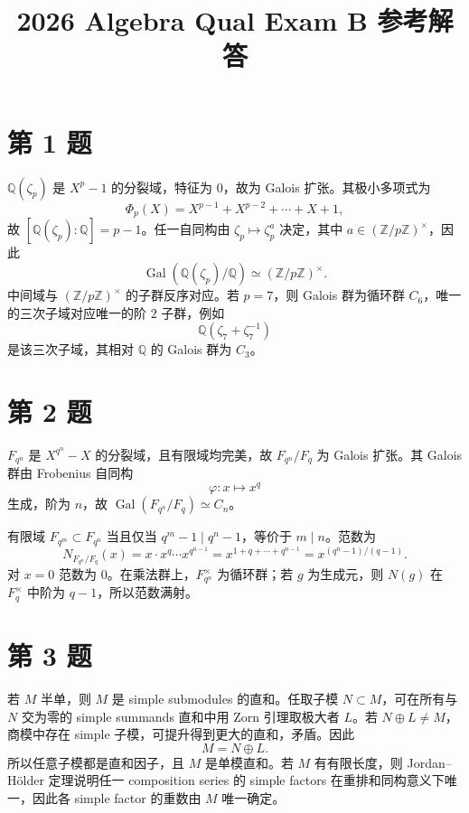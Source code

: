 \documentclass[11pt]{article}
\title{\textbf{2026 Algebra Qual Exam B 参考解答}}
\author{}
\date{}
\begin{document}
\maketitle

\section*{第 1 题}

\(\mathbb Q(\zeta_p)\) 是 \(X^p-1\) 的分裂域，特征为 \(0\)，故为 Galois 扩张。其极小多项式为
\[
  \Phi_p(X)=X^{p-1}+X^{p-2}+\cdots+X+1,
\]
故 \([\mathbb Q(\zeta_p):\mathbb Q]=p-1\)。任一自同构由 \(\zeta_p\mapsto \zeta_p^a\) 决定，其中 \(a\in(\mathbb Z/p\mathbb Z)^\times\)，因此
\[
  \operatorname{Gal}(\mathbb Q(\zeta_p)/\mathbb Q)\simeq(\mathbb Z/p\mathbb Z)^\times.
\]
中间域与 \((\mathbb Z/p\mathbb Z)^\times\) 的子群反序对应。若 \(p=7\)，则 Galois 群为循环群 \(C_6\)，唯一的三次子域对应唯一的阶 \(2\) 子群，例如
\[
  \mathbb Q(\zeta_7+\zeta_7^{-1})
\]
是该三次子域，其相对 \(\mathbb Q\) 的 Galois 群为 \(C_3\)。

\section*{第 2 题}

\(F_{q^n}\) 是 \(X^{q^n}-X\) 的分裂域，且有限域均完美，故 \(F_{q^n}/F_q\) 为 Galois 扩张。其 Galois 群由 Frobenius 自同构
\[
  \varphi:x\mapsto x^q
\]
生成，阶为 \(n\)，故 \(\operatorname{Gal}(F_{q^n}/F_q)\simeq C_n\)。

有限域 \(F_{q^m}\subset F_{q^n}\) 当且仅当 \(q^m-1\mid q^n-1\)，等价于 \(m\mid n\)。范数为
\[
  N_{F_{q^n}/F_q}(x)=x\cdot x^q\cdots x^{q^{n-1}}
  =x^{1+q+\cdots+q^{n-1}}
  =x^{(q^n-1)/(q-1)}.
\]
对 \(x=0\) 范数为 \(0\)。在乘法群上，\(F_{q^n}^\times\) 为循环群；若 \(g\) 为生成元，则 \(N(g)\) 在 \(F_q^\times\) 中阶为 \(q-1\)，所以范数满射。

\section*{第 3 题}

若 \(M\) 半单，则 \(M\) 是 simple submodules 的直和。任取子模 \(N\subset M\)，可在所有与 \(N\) 交为零的 simple summands 直和中用 Zorn 引理取极大者 \(L\)。若 \(N\oplus L\neq M\)，商模中存在 simple 子模，可提升得到更大的直和，矛盾。因此
\[
  M=N\oplus L.
\]
所以任意子模都是直和因子，且 \(M\) 是单模直和。若 \(M\) 有有限长度，则 Jordan--Hölder 定理说明任一 composition series 的 simple factors 在重排和同构意义下唯一，因此各 simple factor 的重数由 \(M\) 唯一确定。
\end{document}
